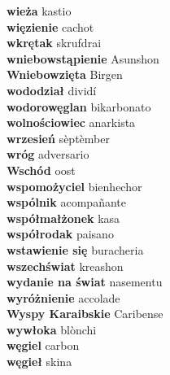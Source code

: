 \textbf{ wieża  } kastio \\
\textbf{ więzienie  } cachot \\
\textbf{ wkrętak  } skrufdrai \\
\textbf{ wniebowstąpienie  } Asunshon \\
\textbf{ Wniebowzięta  } Birgen \\
\textbf{ wododział  } dividí \\
\textbf{ wodorowęglan  } bikarbonato \\
\textbf{ wolnościowiec  } anarkista \\
\textbf{ wrzesień  } sèptèmber \\
\textbf{ wróg  } adversario \\
\textbf{ Wschód  } oost \\
\textbf{ wspomożyciel  } bienhechor \\
\textbf{ wspólnik  } acompañante \\
\textbf{ współmałżonek  } kasa \\
\textbf{ współrodak  } paisano \\
\textbf{ wstawienie się  } buracheria \\
\textbf{ wszechświat  } kreashon \\
\textbf{ wydanie na świat  } nasementu \\
\textbf{ wyróżnienie  } accolade \\
\textbf{ Wyspy Karaibskie  } Caribense \\
\textbf{ wywłoka  } blònchi \\
\textbf{ węgiel  } carbon \\
\textbf{ węgieł  } skina \\
